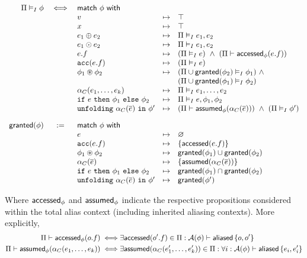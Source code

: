 \begin{align*}
\begin{array}{rclcl}
\Pi \frames \phi &\iff& \tsf{match} \ \phi \ \tsf{with} &&
\\
&& v &\mt&
  \top
\\
&& x &\mt&
  \top
\\
&& e_1 \oplus e_2 &\mt&
  \Pi \frames e_1, e_2
\\
&& e_1 \odot e_2 &\mt&
  \Pi \frames e_1, e_2
\\
&& e.f &\mt&
  (\Pi \frames e) \ \land \ (\Pi \entails \accessed_\phi(e.f))
\\
&& \cacc(e.f) &\mt&
  (\Pi \frames e)
\\
&& \phi_1 \circledast \phi_2 &\mt&
  (\Pi \cup \granted(\phi_2) \frames \phi_1) \ \land \\ &&&&
  (\Pi \cup \granted(\phi_1) \frames \phi_2)
\\
&& \alpha_C(e_1, \dots, e_k) &\mt&
  \Pi \frames e_1, \dots, e_2
\\
&& \cif \ e \ \cthen \ \phi_1 \ \celse \ \phi_2 &\mt&
  \Pi \frames e, \phi_1, \phi_2
\\
&& \cunfolding \ \alpha_C(\vec{e}) \ \cin \ \phi\p &\mt&
  (\Pi \entails \assumed_\phi(\alpha_C(\vec{e}))) \ \land \
  (\Pi \frames \phi\p)
%
\\[1em]
%
\granted(\phi) &:=& \tsf{match} \ \phi \ \tsf{with} &&
\\
&& e &\mt&
  \empty
\\
&& \cacc(e.f) &\mt&
  \set{ \accessed(e.f) }
\\
&& \phi_1 \circast \phi_2 &\mt&
  \granted(\phi_1) \cup \granted(\phi_2)
\\
&& \alpha_C(\vec{e}) &\mt&
  \set{ \assumed(\alpha_C(\vec{e})) }
\\
&& \cif \ e \ \cthen \ \phi_1 \ \celse \ \phi_2 &\mt&
  \granted(\phi_1) \cap \granted(\phi_2)
\\
&& \cunfolding \ \alpha_C(\vec{e}) \ \cin \ \phi\p &\mt&
  \granted(\phi\p)
\end{array}
\end{align*}

\noindent
Where $\textsf{accessed}_\phi$ and $\textsf{assumed}_\phi$ indicate the respective propositions considered within the total alias context (including inherited aliasing contexts). More explicitly,
\begin{align*}
\Pi \vdash \textsf{accessed}_\phi(o.f)
\iff &
  \exists \textsf{accessed}(o^\prime.f) \in \Pi :
  \mathcal{A}(\phi) \vdash \textsf{aliased}\left\{ o, o^\prime \right\}
\\
\Pi \vdash \textsf{assumed}_\phi(\alpha_C(e_1, \dots, e_k))
\iff &
  \exists \textsf{assumed}(\alpha_C(e^\prime_1, \dots, e^\prime_k)) \in \Pi :
  \forall i : \mathcal{A}(\phi) \vdash \textsf{aliased}\left\{ e_i, e^\prime_i \right\}
\end{align*}

